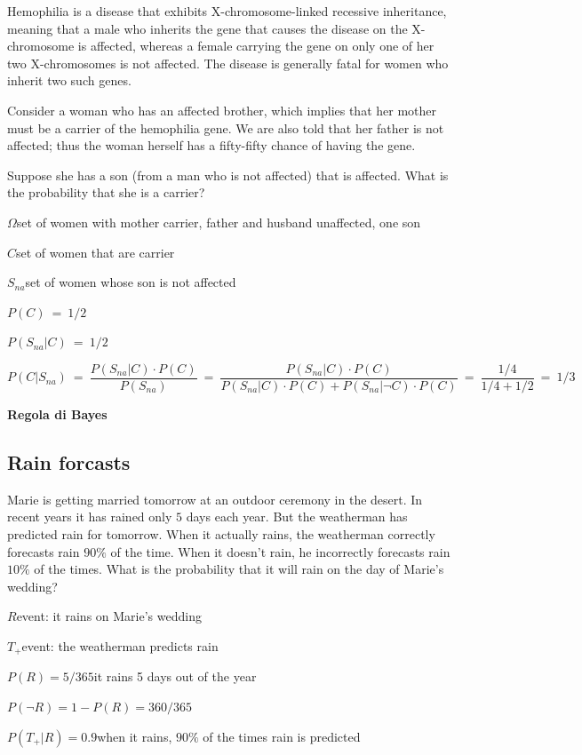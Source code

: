 \documentclass[12pt,openany]{book}
\theoremstyle{mio}
\theoremstyle{liscio}
\begin{document}
Hemophilia is a disease that exhibits X-chromosome-linked recessive inheritance, meaning that a male who inherits the gene that causes the disease on the X-chromosome is affected, whereas a
female carrying the gene on only one of her two X-chromosomes is not affected. The disease is generally fatal for women who inherit two such genes.

Consider a woman who has an affected brother, which implies that her mother must be a carrier of the hemophilia gene. We are also told that her father is not affected; thus the woman herself has a fifty-fifty chance of having the gene.

Suppose she has a son (from a man who is not affected) that is affected. What is the probability that she is a carrier?

$\Omega$\hfill  set of women with mother carrier, father and husband unaffected, one son

$C$\hfill set of women that are carrier

$S_{na}$\hfill set of women whose son is not affected

$P(C)\ =\ 1/2$\hfill 

$P(S_{na}|C)\ =\ 1/2$\hfill 

$P(C|S_{na})\ =\ \dfrac{P(S_{na}|C)\cdot P(C)}{P(S_{na})}\ =\ \dfrac{P(S_{na}|C)\cdot P(C)}{P(S_{na}|C)\cdot P(C)+P(S_{na}|\neg C)\cdot P(C)}\ =\ \dfrac{1/4}{1/4+1/2}\ =\ 1/3$


\clearpage\hfill\textbf{Regola di Bayes}
\subsection{Rain forcasts}
\label{rain_desert}

Marie is getting married tomorrow at an outdoor ceremony in the desert. In recent years it has rained only $5$ days each year. But the weatherman has predicted rain for tomorrow. When it actually rains, the weatherman correctly forecasts rain $90\%$ of the time. When it doesn’t rain, he incorrectly forecasts rain $10\%$ of the times. What is the probability that it will rain on the day of Marie’s wedding?


$R$\hfill event: it rains on Marie’s wedding

$T_+$\hfill event: the weatherman predicts rain

$P (R) = 5/365$\hfill it rains 5 days out of the year

$P (\neg R) = 1-P(R)= 360/365$

$P (T_+|R) = 0.9$\hfill when it rains, $90\%$ of the times rain is predicted
\end{document}
